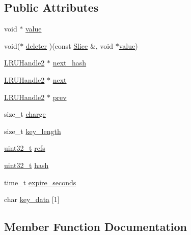 \subsection*{Public Attributes}
\begin{DoxyCompactItemize}
\item 
void $\ast$ \hyperlink{structleveldb_1_1_l_r_u_handle2_a3ffe79f1bd110090a6ab07aee282df9c}{value}
\item 
void($\ast$ \hyperlink{structleveldb_1_1_l_r_u_handle2_a2504959e08f60490317bf177f2d94b32}{deleter} )(const \hyperlink{classleveldb_1_1_slice}{Slice} \&, void $\ast$\hyperlink{structleveldb_1_1_l_r_u_handle2_a3ffe79f1bd110090a6ab07aee282df9c}{value})
\item 
\hyperlink{structleveldb_1_1_l_r_u_handle2}{L\+R\+U\+Handle2} $\ast$ \hyperlink{structleveldb_1_1_l_r_u_handle2_ac30557a1e72505c47fb9a7965c3f9cb4}{next\+\_\+hash}
\item 
\hyperlink{structleveldb_1_1_l_r_u_handle2}{L\+R\+U\+Handle2} $\ast$ \hyperlink{structleveldb_1_1_l_r_u_handle2_ade44c57a74b4abefdcdd880b8f501f96}{next}
\item 
\hyperlink{structleveldb_1_1_l_r_u_handle2}{L\+R\+U\+Handle2} $\ast$ \hyperlink{structleveldb_1_1_l_r_u_handle2_a3f91db72da907049b9dce9f83b928ad2}{prev}
\item 
size\+\_\+t \hyperlink{structleveldb_1_1_l_r_u_handle2_af4437dd6c30320f5d75b6af0378df1e1}{charge}
\item 
size\+\_\+t \hyperlink{structleveldb_1_1_l_r_u_handle2_a7387d7e513de3790db6f600a530b629e}{key\+\_\+length}
\item 
\hyperlink{stdint_8h_a435d1572bf3f880d55459d9805097f62}{uint32\+\_\+t} \hyperlink{structleveldb_1_1_l_r_u_handle2_ab287d8de60487ff8c397022720ff36a0}{refs}
\item 
\hyperlink{stdint_8h_a435d1572bf3f880d55459d9805097f62}{uint32\+\_\+t} \hyperlink{structleveldb_1_1_l_r_u_handle2_ab12731b19c2020889befba920e0a3151}{hash}
\item 
time\+\_\+t \hyperlink{structleveldb_1_1_l_r_u_handle2_a642dcf5f7af626ff903364859e15bbca}{expire\+\_\+seconds}
\item 
char \hyperlink{structleveldb_1_1_l_r_u_handle2_a51ec4315b8979eec6b57fad1fe4dd4f0}{key\+\_\+data} \mbox{[}1\mbox{]}
\end{DoxyCompactItemize}


\subsection{Member Function Documentation}
\hypertarget{structleveldb_1_1_l_r_u_handle2_ab68a98fe5a6319cac01b266da1cf2e6a}{}
